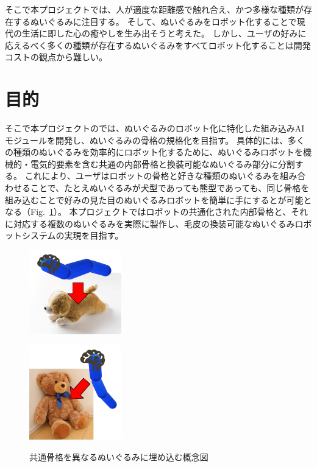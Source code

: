 \documentclass[uplatex,a4paper,12pt]{jsarticle}
\renewcommand{\figurename}{Fig.}
\newcommand{\figref}[1]{\figurename~\ref{#1}}
\begin{document}
そこで本プロジェクトでは、人が適度な距離感で触れ合え、かつ多様な種類が存在するぬいぐるみに注目する。
そして、ぬいぐるみをロボット化することで現代の生活に即した心の癒やしを生み出そうと考えた。
しかし、ユーザの好みに応えるべく多くの種類が存在するぬいぐるみをすべてロボット化することは開発コストの観点から難しい。


\section{目的}
そこで本プロジェクトのでは、ぬいぐるみのロボット化に特化した組み込みAIモジュールを開発し、ぬいぐるみの骨格の規格化を目指す。
具体的には、多くの種類のぬいぐるみを効率的にロボット化するために、ぬいぐるみロボットを機械的・電気的要素を含む共通の内部骨格と換装可能なぬいぐるみ部分に分割する。
これにより、ユーザはロボットの骨格と好きな種類のぬいぐるみを組み合わせることで、たとえぬいぐるみが犬型であっても熊型であっても、同じ骨格を組み込むことで好みの見た目のぬいぐるみロボットを簡単に手にするとが可能となる（\figref{fig:mohutics:concept_embed}）。
本プロジェクトではロボットの共通化された内部骨格と、それに対応する複数のぬいぐるみを実際に製作し、毛皮の換装可能なぬいぐるみロボットシステムの実現を目指す。

\begin{figure}[htbp]
  \centering
  \begin{minipage}[c]{0.48\linewidth}
    \centering
    \includegraphics[keepaspectratio,width=4cm,clip]{images/mohutics/concept_dog.png}
    \label{fig:mohutics:concept_dog}
  \end{minipage}
  \begin{minipage}[c]{0.48\linewidth}
    \centering
    \includegraphics[keepaspectratio,width=4cm,clip]{images/mohutics/concept_bear.png}
    \label{fig:mohutics:concept_bear}
  \end{minipage}
  \caption{共通骨格を異なるぬいぐるみに埋め込む概念図}
  \label{fig:mohutics:concept_embed}
\end{figure}
\end{document}
